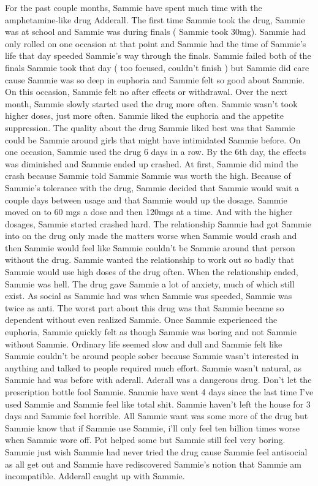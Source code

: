 \documentclass[12pt]{book}
\begin{document}
For the past couple months, Sammie have spent much time with the amphetamine-like drug Adderall. The first time Sammie took the drug, Sammie was at school and Sammie was during finals ( Sammie took 30mg). Sammie had only rolled on one occasion at that point and Sammie had the time of Sammie's life that day speeded Sammie's way through the finals. Sammie failed both of the finals Sammie took that day ( too focused, couldn't finish ) but Sammie did care cause Sammie was so deep in euphoria and Sammie felt so good about Sammie. On this occasion, Sammie felt no after effects or withdrawal. Over the next month, Sammie slowly started used the drug more often. Sammie wasn't took higher doses, just more often. Sammie liked the euphoria and the appetite suppression. The quality about the drug Sammie liked best was that Sammie could be Sammie around girls that might have intimidated Sammie before. On one occasion, Sammie used the drug 6 days in a row. By the 6th day, the effects was diminished and Sammie ended up crashed. At first, Sammie did mind the crash because Sammie told Sammie Sammie was worth the high. Because of Sammie's tolerance with the drug, Sammie decided that Sammie would wait a couple days between usage and that Sammie would up the dosage. Sammie moved on to 60 mgs a dose and then 120mgs at a time. And with the higher dosages, Sammie started crashed hard. The relationship Sammie had got Sammie into on the drug only made the matters worse when Sammie would crash and then Sammie would feel like Sammie couldn't be Sammie around that person without the drug. Sammie wanted the relationship to work out so badly that Sammie would use high doses of the drug often. When the relationship ended, Sammie was hell. The drug gave Sammie a lot of anxiety, much of which still exist. As social as Sammie had was when Sammie was speeded, Sammie was twice as anti. The worst part about this drug was that Sammie became so dependent without even realized Sammie. Once Sammie experienced the euphoria, Sammie quickly felt as though Sammie was boring and not Sammie without Sammie. Ordinary life seemed slow and dull and Sammie felt like Sammie couldn't be around people sober because Sammie wasn't interested in anything and talked to people required much effort. Sammie wasn't natural, as Sammie had was before with aderall. Aderall was a dangerous drug. Don't let the prescription bottle fool Sammie. Sammie have went 4 days since the last time I've used Sammie and Sammie feel like total shit. Sammie haven't left the house for 3 days and Sammie feel horrible. All Sammie want was some more of the drug but Sammie know that if Sammie use Sammie, i'll only feel ten billion times worse when Sammie wore off. Pot helped some but Sammie still feel very boring. Sammie just wish Sammie had never tried the drug cause Sammie feel antisocial as all get out and Sammie have rediscovered Sammie's notion that Sammie am incompatible. Adderall caught up with Sammie.
\end{document}
